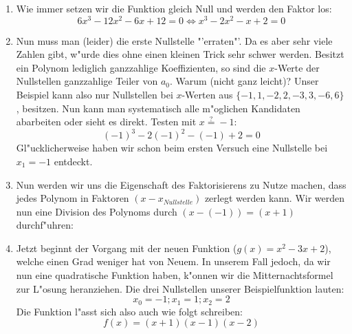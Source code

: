 \begin{enumerate}
\item Wie immer setzen wir die Funktion gleich Null und werden den Faktor los:
\begin{equation*}
6x^3 - 12x^2 - 6x + 12 = 0 \iff x^3 -2x^2 - x + 2 = 0
\end{equation*}

\item Nun muss man (leider) die erste Nullstelle "'erraten"'. Da es aber sehr viele Zahlen gibt, w"urde dies ohne einen kleinen Trick sehr schwer werden. Besitzt ein Polynom lediglich ganzzahlige Koeffizienten, so sind die $x$-Werte der Nullstellen ganzzahlige Teiler von $a_0$. Warum (nicht ganz leicht)? Unser Beispiel kann also nur Nullstellen bei $x$-Werten aus $\{-1,1,-2,2,-3,3,-6, 6\}$, besitzen. Nun kann man systematisch alle m"oglichen Kandidaten abarbeiten oder sieht es direkt. Testen mit $x \stackrel{?}{=} -1$:
\begin{equation*}
(-1)^3 - 2(-1)^2 - (-1) + 2 = 0
\end{equation*}
Gl"ucklicherweise haben wir schon beim ersten Versuch eine Nullstelle bei $x_1 = -1$ entdeckt.
\item Nun werden wir uns die Eigenschaft des Faktorisierens zu Nutze machen, dass jedes Polynom in Faktoren $(x-x_{Nullstelle})$ zerlegt werden kann. Wir werden nun eine Division des Polynoms durch $(x-(-1)) = (x + 1)$ durchf"uhren:

\item Jetzt beginnt der Vorgang mit der neuen Funktion ($g(x) = x^2 - 3x + 2$), welche einen Grad weniger hat von Neuem. In unserem Fall jedoch, da wir nun eine quadratische Funktion haben, k"onnen wir die Mitternachtsformel zur L"osung heranziehen. Die drei Nullstellen unserer Beispielfunktion lauten:
\begin{equation*}
x_0 = -1; x_1 = 1; x_2 = 2
\end{equation*}
Die Funktion l"asst sich also auch wie folgt schreiben:
\begin{equation*}
f(x)=(x+1)(x-1)(x-2)
\end{equation*}
\end{enumerate}
